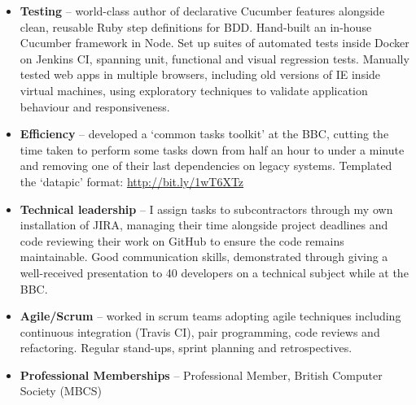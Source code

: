 \documentclass[class=article, crop=false]{standalone}
\begin{document}
\begin{itemize}
\begin{itemize}
    \end{itemize}

    \item \textbf{Testing} – world-class author of declarative Cucumber features alongside clean, reusable Ruby step definitions for BDD. Hand-built an in-house Cucumber framework in Node. Set up suites of automated tests inside Docker on Jenkins CI, spanning unit, functional and visual regression tests. Manually tested web apps in multiple browsers, including old versions of IE inside virtual machines, using exploratory techniques to validate application behaviour and responsiveness.

    \item \textbf{Efficiency} – developed a ‘common tasks toolkit’ at the BBC, cutting the time taken to perform some tasks down from half an hour to under a minute and removing one of their last dependencies on legacy systems. Templated the ‘datapic’ format: \url{http://bit.ly/1wT6XTz}

    \item \textbf{Technical leadership} – I assign tasks to subcontractors through my own installation of JIRA, managing their time alongside project deadlines and code reviewing their work on GitHub to ensure the code remains maintainable. Good communication skills, demonstrated through giving a well-received presentation to 40 developers on a technical subject while at the BBC.

    \item \textbf{Agile/Scrum} – worked in scrum teams adopting agile techniques including continuous integration (Travis CI), pair programming, code reviews and refactoring. Regular stand-ups, sprint planning and retrospectives.

    \item \textbf{Professional Memberships} – Professional Member, British Computer Society (MBCS)

\end{itemize}
\end{document}
